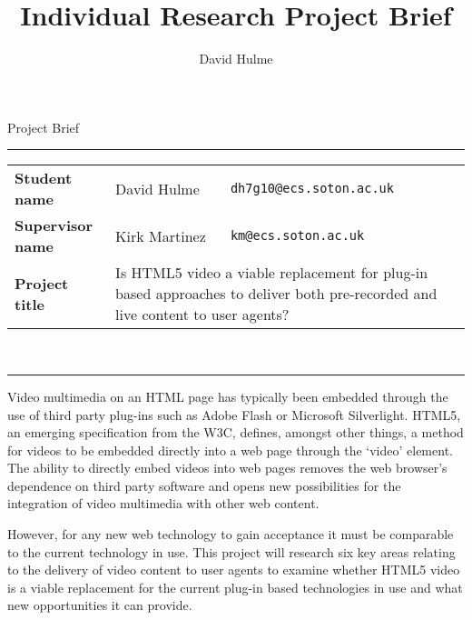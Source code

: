 \documentclass[a4paper]{article}
\title{Individual Research Project Brief}
\author{David Hulme}
\begin{document}
\pagestyle{fancy}
\fancyhead{}
\fancyfoot{}
\fancyfoot[LO,LE]{\thepage}
\fancyfoot[RO, RE]{\today}

\begin{center}
\huge{Project Brief}\\
[1cm]
\end{center}
\hrule
\begin{tabular}{p{5cm}p{4cm}p{4cm}}
    
        \textbf{Student name}         & David Hulme   & \texttt{dh7g10@ecs.soton.ac.uk} \\ 
        \textbf{Supervisor name}      & Kirk Martinez & \texttt{km@ecs.soton.ac.uk}     \\ 
        \textbf{Project title} & \multicolumn{2}{p{10cm}}{Is HTML5 video a viable replacement for plug-in based approaches to deliver both pre-recorded and live content to user agents?} \\

\end{tabular} \\
[0.2cm]
\hrule
\vspace{0.4cm}
Video multimedia on an HTML page has typically been embedded through the use of third party plug-ins such as Adobe Flash or Microsoft Silverlight. HTML5, an emerging specification from the W3C, defines, amongst other things, a method for videos to be embedded directly into a web page through the `video' element. The ability to directly embed videos into web pages removes the web browser's dependence on third party software and opens new possibilities for the integration of video multimedia with other web content.

However, for any new web technology to gain acceptance it must be comparable to the current technology in use. This project will research six key areas relating to the delivery of video content to user agents to examine whether HTML5 video is a viable replacement for the current plug-in based technologies in use and what new opportunities it can provide.
\end{document}
